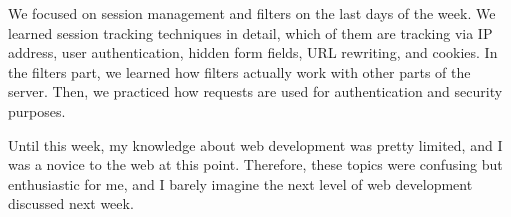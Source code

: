 We focused on session management and filters on the last days of the week. We learned session tracking techniques in detail, which of them are tracking via IP address, user authentication, hidden form fields, URL rewriting, and cookies. In the filters part, we learned how filters actually work with other parts of the server. Then, we practiced how requests are used for authentication and security purposes.

Until this week, my knowledge about web development was pretty limited, and I was a novice to the web at this point. Therefore, these topics were confusing but enthusiastic for me, and I barely imagine the next level of web development discussed next week.